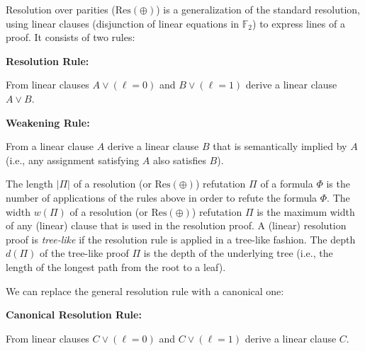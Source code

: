 Resolution over parities ($\text{Res}(\oplus)$) is a generalization of the standard resolution, using linear clauses (disjunction of linear equations in $\mathbb{F}_{2}$) to express lines of a proof.
It consists of two rules:\par


\textbf{Resolution Rule:}



From linear clauses $A\vee(\ell=0)$ and $B\vee(\ell=1)$ derive a linear clause $A\vee B$.\par



\textbf{Weakening Rule:}



From a linear clause $A$ derive a linear clause $B$ that is semantically implied by $A$ (i.e., any assignment satisfying $A$ also satisfies $B$).\par





The length $|\Pi|$ of a resolution (or $\text{Res}(\oplus)$) refutation $\Pi$ of a formula $\Phi$ is the number of applications of the rules above in order to refute the formula $\Phi.$
The width $w(\Pi)$ of a resolution (or $\text{Res}(\oplus)$) refutation $\Pi$ is the maximum width of any (linear) clause that is used in the resolution proof.
A (linear) resolution proof is \emph{tree-like} if the resolution rule is applied in a tree-like fashion.
The depth $d(\Pi)$ of the tree-like proof $\Pi$ is the depth of the underlying tree (i.e., the length of the longest path from the root to a leaf).\par




We can replace the general resolution rule with a canonical one:\par


\textbf{Canonical Resolution Rule:}



From linear clauses $C\vee(\ell=0)$ and $C\vee(\ell=1)$ derive a linear clause $C$.\par





